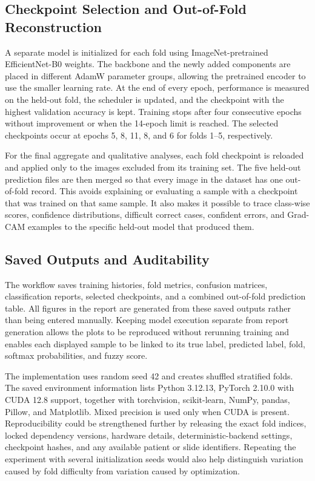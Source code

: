 \documentclass[10pt,conference]{IEEEtran}
\begin{document}
\subsection{Checkpoint Selection and Out-of-Fold Reconstruction}
A separate model is initialized for each fold using ImageNet-pretrained EfficientNet-B0 weights. The backbone and the newly added components are placed in different AdamW parameter groups, allowing the pretrained encoder to use the smaller learning rate. At the end of every epoch, performance is measured on the held-out fold, the scheduler is updated, and the checkpoint with the highest validation accuracy is kept. Training stops after four consecutive epochs without improvement or when the 14-epoch limit is reached. The selected checkpoints occur at epochs 5, 8, 11, 8, and 6 for folds 1--5, respectively.

For the final aggregate and qualitative analyses, each fold checkpoint is reloaded and applied only to the images excluded from its training set. The five held-out prediction files are then merged so that every image in the dataset has one out-of-fold record. This avoids explaining or evaluating a sample with a checkpoint that was trained on that same sample. It also makes it possible to trace class-wise scores, confidence distributions, difficult correct cases, confident errors, and Grad-CAM examples to the specific held-out model that produced them.

\subsection{Saved Outputs and Auditability}
The workflow saves training histories, fold metrics, confusion matrices, classification reports, selected checkpoints, and a combined out-of-fold prediction table. All figures in the report are generated from these saved outputs rather than being entered manually. Keeping model execution separate from report generation allows the plots to be reproduced without rerunning training and enables each displayed sample to be linked to its true label, predicted label, fold, softmax probabilities, and fuzzy score.

The implementation uses random seed 42 and creates shuffled stratified folds. The saved environment information lists Python 3.12.13, PyTorch 2.10.0 with CUDA 12.8 support, together with torchvision, scikit-learn, NumPy, pandas, Pillow, and Matplotlib. Mixed precision is used only when CUDA is present. Reproducibility could be strengthened further by releasing the exact fold indices, locked dependency versions, hardware details, deterministic-backend settings, checkpoint hashes, and any available patient or slide identifiers. Repeating the experiment with several initialization seeds would also help distinguish variation caused by fold difficulty from variation caused by optimization.
\end{document}
